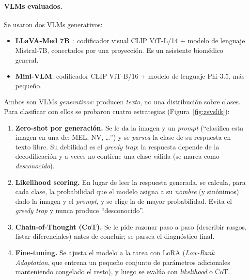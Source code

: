 \documentclass[11pt, a4paper]{article}
\begin{document}
\paragraph{VLMs evaluados.} Se usaron dos VLMs generativos:
\begin{itemize}[leftmargin=1.6em]
  \item \textbf{LLaVA-Med 7B}~\cite{li2024llavamed}: codificador visual CLIP ViT-L/14 + modelo de
  lenguaje Mistral-7B, conectados por una proyección. Es un asistente biomédico general.
  \item \textbf{Mini-VLM}: codificador CLIP ViT-B/16 + modelo de lenguaje Phi-3.5, más pequeño.
\end{itemize}
Ambos son VLMs \emph{generativos}: producen \emph{texto}, no una distribución sobre clases. Para
clasificar con ellos se probaron cuatro estrategias (Figura~\ref{fig:zsvslik}):

\begin{enumerate}[leftmargin=1.6em]
  \item \textbf{Zero-shot por generación.} Se le da la imagen y un \emph{prompt} (``clasifica esta
  imagen en una de: MEL, NV, \dots'') y se \emph{parsea} la clase de su respuesta en texto libre. Su
  debilidad es el \emph{greedy trap}: la respuesta depende de la decodificación y a veces no contiene
  una clase válida (se marca como \emph{desconocido}).
  \item \textbf{Likelihood scoring.} En lugar de leer la respuesta generada, se calcula, para cada
  clase, la probabilidad que el modelo asigna a su \emph{nombre} (y sinónimos) dado la imagen y el
  \emph{prompt}, y se elige la de mayor probabilidad. Evita el \emph{greedy trap} y nunca produce
  ``desconocido''.
  \item \textbf{Chain-of-Thought (CoT).} Se le pide razonar paso a paso (describir rasgos, listar
  diferenciales) antes de concluir; se parsea el diagnóstico final.
  \item \textbf{Fine-tuning.} Se ajusta el modelo a la tarea con LoRA (\emph{Low-Rank Adaptation}, que
  entrena un pequeño conjunto de parámetros adicionales manteniendo congelado el resto), y luego se
  evalúa con \emph{likelihood} o CoT.
\end{enumerate}
\end{document}
